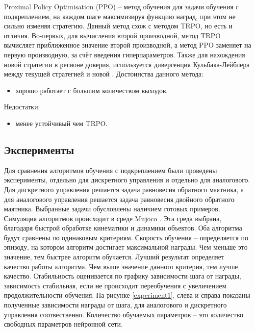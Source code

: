 Proximal Policy Optimisation (PPO) -- метод обучения для задачи обучения с подкреплением, на каждом шаге максимизируя функцию наград, при этом не сильно изменяя стратегию. 
Данный метод схож с методом TRPO, но есть и отличия.
Во-первых, для вычисления второй производной, метод TRPO вычисляет приближенное значение второй производной, а  метод PPO  заменяет на первую производную, за счёт введения гиперпараметров. 
Также для нахождения новой стратегии в регионе доверия, используется дивергенция Кульбака-Лейблера между текущей стратегией и новой \cite{ppo}.
Достоинства данного метода:
\begin{itemize}
	\item хорошо работает с большим количеством выходов.
\end{itemize}

Недостатки:
\begin{itemize}
	\item менее устойчивый чем TRPO.
\end{itemize} 



\subsection{Эксперименты}
Для сравнения алгоритмов обучения с подкреплением были проведены эксперименты, отдельно для дискретного управления и отдельно для аналогового. 
Для дискретного управления решается задача равновесия обратного маятника, а для аналогового управления решается задача равновесия двойного обратного маятника. 
Выбранные задачи обусловлены наличием готовых примеров. 
Симуляция алгоритмов происходит в среде Mujoco \cite{mujoco}. Эта среда выбрана, благодаря быстрой обработке кинематики и динамики объектов.
Оба алгоритма будут сравнены по одинаковым критериям. 
Скорость обучения -- определяется по эпизоду, на котором алгоритм достигает максимальной награды. 
Чем меньше это значение, тем быстрее алгоритм обучается. 
Лучший результат определяет качество работы алгоритма. 
Чем выше значение данного критерия, тем лучше качество. 
Стабильность оценивается по графику зависимости шага от награды, зависимость стабильная, если не происходит переобучения с увеличением продолжительности обучения. 
На рисунке \ref{experiment1}, слева и справа показаны полученные зависимости награды от шага, для аналогового и дискретного управления соотвественно. 
Количество обучаемых параметров -- это количество свободных параметров нейронной сети. 


